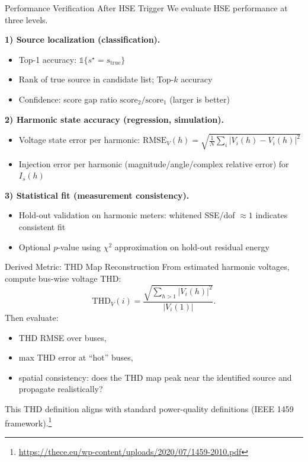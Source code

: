 \documentclass[aspectratio=169]{beamer}
\begin{document}
\begin{frame}{Performance Verification After HSE Trigger}
We evaluate HSE performance at three levels.

\vspace{0.4em}
\textbf{1) Source localization (classification).}
\begin{itemize}
  \item Top-1 accuracy: $\mathbb{1}\{s^\star = s_{\mathrm{true}}\}$
  \item Rank of true source in candidate list; Top-$k$ accuracy
  \item Confidence: score gap ratio $\mathrm{score}_2/\mathrm{score}_1$ (larger is better)
\end{itemize}

\vspace{0.4em}
\textbf{2) Harmonic state accuracy (regression, simulation).}
\begin{itemize}
  \item Voltage state error per harmonic: $\mathrm{RMSE}_V(h)=\sqrt{\frac{1}{N}\sum_i|V_i^{\hat{}}(h)-V_i(h)|^2}$
  \item Injection error per harmonic (magnitude/angle/complex relative error) for $I_s(h)$
\end{itemize}

\vspace{0.4em}
\textbf{3) Statistical fit (measurement consistency).}
\begin{itemize}
  \item Hold-out validation on harmonic meters: whitened SSE/dof $\approx 1$ indicates consistent fit
  \item Optional $p$-value using $\chi^2$ approximation on hold-out residual energy
\end{itemize}

\end{frame}

\begin{frame}{Derived Metric: THD Map Reconstruction}
From estimated harmonic voltages, compute bus-wise voltage THD:
\[
\mathrm{THD}_V(i)=\frac{\sqrt{\sum_{h>1}|V_i(h)|^2}}{|V_i(1)|}.
\]
Then evaluate:
\begin{itemize}
  \item THD RMSE over buses,
  \item max THD error at ``hot'' buses,
  \item spatial consistency: does the THD map peak near the identified source and propagate realistically?
\end{itemize}

\vspace{0.3em}
\small
This THD definition aligns with standard power-quality definitions (IEEE 1459 framework).\footnote{\url{https://thece.eu/wp-content/uploads/2020/07/1459-2010.pdf}}
\end{frame}
\end{document}
